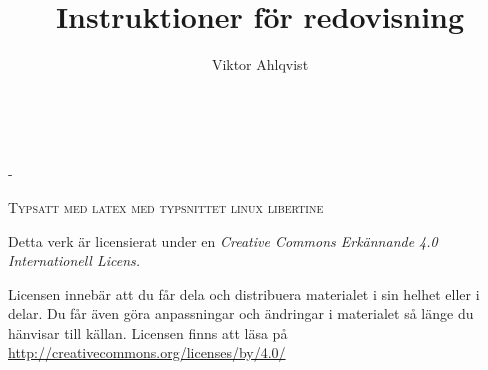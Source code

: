 \documentclass[%
	a4paper,
	twoside,
	titlepage,
	swedish,
	DIV=7,
	]{scrbook}
\title{Instruktioner för redovisning}
\author{Viktor Ahlqvist}
\newlength{\overhang}
\begin{document}
\frontmatter

\makeatletter
\begin{titlepage}
	\begin{flushright}
	\vspace*{0.45\textheight}
	{\Large \@title \\}
	{\scshape \@author}
	\end{flushright}


\end{titlepage}
\makeatother

\newpage
\begin{addmargin*}[0em]{-\overhang}
~\vfill
\thispagestyle{empty}



\par\textsc{Typsatt med latex med typsnittet linux libertine}\\[2\baselineskip]

\par Detta verk är licensierat under en \emph{Creative Commons Erkännande 4.0 Internationell Licens.}

Licensen innebär att du får dela och distribuera materialet i sin helhet eller i delar. Du får även göra anpassningar och ändringar i materialet så länge du hänvisar till källan. Licensen finns att läsa på \url{http://creativecommons.org/licenses/by/4.0/} 


\end{addmargin*}


\end{document}
